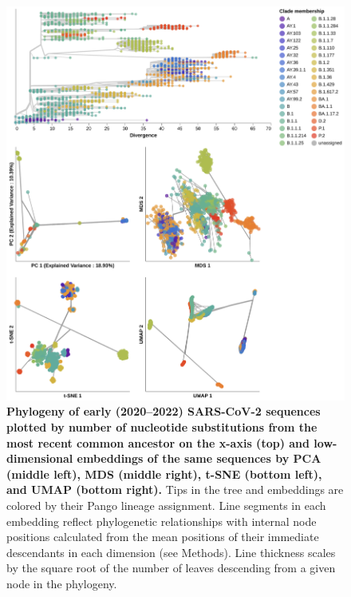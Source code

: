 \begin{figure}[!h]
\includegraphics[width=\columnwidth]{figures/sarscov2-embeddings-by-Nextclade_pango_collapsed-clade.png}
\caption{{\bf Phylogeny of early (2020--2022) SARS-CoV-2 sequences plotted by number of nucleotide substitutions from the most recent common ancestor on the x-axis (top) and low-dimensional embeddings of the same sequences by PCA (middle left), MDS (middle right), t-SNE (bottom left), and UMAP (bottom right).}
  Tips in the tree and embeddings are colored by their Pango lineage assignment.
  Line segments in each embedding reflect phylogenetic relationships with internal node positions calculated from the mean positions of their immediate descendants in each dimension (see Methods).
  Line thickness scales by the square root of the number of leaves descending from a given node in the phylogeny.
}\label{S_Fig_sarscov2_early_embeddings_by_Nextclade_pango}
\end{figure}

